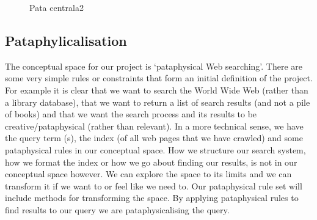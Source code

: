 

\begin{figure}[htb] %
  \centering
  
\caption[Pata centrala2]{Pata centrala2}
\label{fig:patasearch02}
\end{figure}


\subsection*{Pataphylicalisation}


The conceptual space for our project is `pataphysical Web searching'. There are some very simple rules or constraints that form an initial definition of the project. For example it is clear that we want to search the World Wide Web (rather than a library database), that we want to return a list of search results (and not a pile of books) and that we want the search process and its results to be creative/pataphysical (rather than relevant).  In a more technical sense, we have the query term (s), the index (of all web pages that we have crawled) and some pataphysical rules in our conceptual space. How we structure our search system, how we format the index or how we go about finding our results, is not in our conceptual space however. We can explore the space to its limits and we can transform it if we want to or feel like we need to. Our pataphysical rule set will include methods for transforming the space. By applying pataphysical rules to find results to our query we are pataphysicalising the query.


